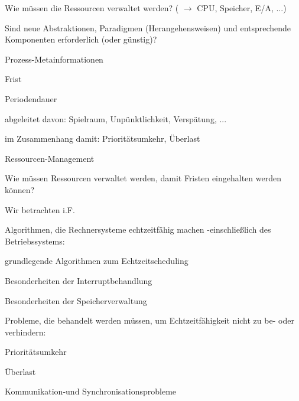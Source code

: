 \documentclass[a4paper]{article}
\begin{document}
\begin{multicols}{3}
\begin{itemize*}
\begin{enumerate*}
            \item Wie müssen die Ressourcen verwaltet werden? ( $\rightarrow$ CPU, Speicher, E/A, ...)
            \item Sind neue Abstraktionen, Paradigmen (Herangehensweisen) und entsprechende Komponenten erforderlich (oder günstig)?
        \end{enumerate*}
        \item
        Prozess-Metainformationen
        \begin{enumerate*}

            \item Frist
            \item Periodendauer
            \item abgeleitet davon: Spielraum, Unpünktlichkeit, Verspätung, ...
            \item im Zusammenhang damit: Prioritätsumkehr, Überlast
        \end{enumerate*}
        \item
        Ressourcen-Management
        \begin{itemize*}
            \item Wie müssen Ressourcen verwaltet werden, damit Fristen eingehalten werden können?
        \end{itemize*}
    \end{itemize*}

    Wir betrachten i.F.

    \begin{enumerate*}
        \item
        Algorithmen, die Rechnersysteme echtzeitfähig machen -einschließlich
        des Betriebssystems:
        \begin{itemize*}
            \item grundlegende Algorithmen zum Echtzeitscheduling
            \item Besonderheiten der Interruptbehandlung
            \item Besonderheiten der Speicherverwaltung
        \end{itemize*}
        \item
        Probleme, die behandelt werden müssen, um Echtzeitfähigkeit nicht zu
        be- oder verhindern:
        \begin{itemize*}
            \item Prioritätsumkehr
            \item Überlast
            \item Kommunikation-und Synchronisationsprobleme
        \end{itemize*}
    \end{enumerate*}



\end{multicols}
\end{document}
